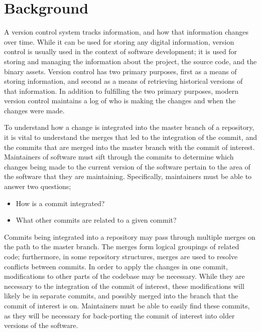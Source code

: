 \chapter{Background}\label{chap:background}

A version control system tracks information, and how that information
changes over time. While it can be used for storing any digital
information, version control is usually used in the context of software
development; it is used for storing and managing the information about
the project, the source code, and the binary assets. Version control has
two primary purposes, first as a means of storing information, and
second as a means of retrieving historical versions of that information.
In addition to fulfilling the two primary purposes, modern version
control maintains a log of who is making the changes and when the
changes were made.

To understand how a change is integrated into the master branch of a
repository, it is vital to understand the merges that led to the
integration of the commit, and the commits that are merged into the
master branch with the commit of interest. Maintainers of software must
sift through the commits to determine which changes being made to the
current version of the software pertain to the area of the software that
they are maintaining. Specifically, maintainers must be able to answer
two questions;

\begin{textbox}
\begin{itemize}
  \item How is a commit integrated?
  \item What other commits are related to a given commit?
\end{itemize}
\end{textbox}

Commits being integrated into a repository may pass through multiple
merges on the path to the master branch. The merges form logical
groupings of related code; furthermore, in some repository structures,
merges are used to resolve conflicts between commits. In order to apply
the changes in one commit, modifications to other parts of the codebase
may be necessary. While they are necessary to the integration of the
commit of interest, these modifications will likely be in separate
commits, and possibly merged into the branch that the commit of interest
is on. Maintainers must be able to easily find these commits, as they
will be necessary for back-porting the commit of interest into older
versions of the software.

